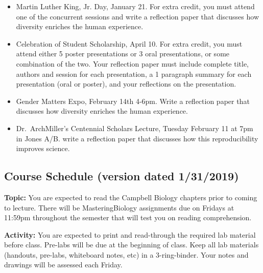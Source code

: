 \documentclass{tufte-handout}
\begin{document}
\begin{fullwidth}
\begin{itemize}
\item Martin Luther King, Jr. Day, January 21. For extra credit, you must attend one of the concurrent sessions and write a reflection paper that discusses how diversity enriches the human experience. 
\item Celebration of Student Scholarship, April 10.  For extra credit, you must attend either 5 poster presentations or 3 oral presentations, or some combination of the two.  Your reflection paper must include complete title, authors and session for each presentation, a 1 paragraph summary for each presentation (oral or poster), and your reflections on the presentation.  	
\item Gender Matters Expo, February 14th 4-6pm. Write a reflection paper that discusses how diversity enriches the human experience.
\item Dr.\ ArchMiller's Centennial Scholars Lecture, Tuesday February 11 at 7pm in Jones A/B. write a reflection paper that discusses how this reproducibility improves science.
\end{itemize}









\newpage
\subsection{Course Schedule (version dated 1/31/2019)}
%

\textbf{Topic:} You are expected to read the Campbell Biology chapters prior to coming to lecture.  There will be MasteringBiology assignments due on Fridays at 11:59pm throughout the semester that will test you on reading comprehension. 

\textbf{Activity:} You are expected to print and read-through the required lab material before class. Pre-labs will be due at the beginning of class. Keep all lab materials (handouts, pre-labs, whiteboard notes, etc) in a 3-ring-binder. Your notes and drawings will be assessed each Friday.


\end{fullwidth}
\end{document}
